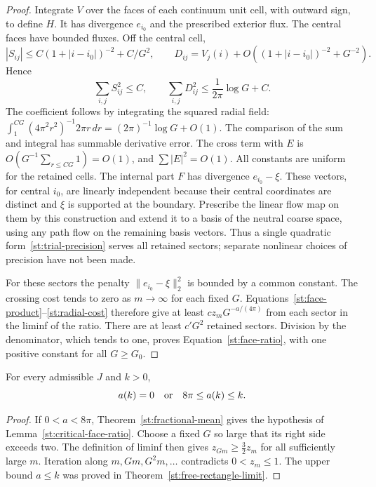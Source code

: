 \begin{proof}
Integrate $V$ over the faces of each continuum unit cell, with outward
sign, to define $H$. It has divergence $e_{i_0}$ and the prescribed exterior
flux. The central faces have bounded fluxes. Off the central cell,
\[
 |S_{ij}|\le C(1+|i-i_0|)^{-2}+C/G^2,
 \qquad D_{ij}=V_j(i)+O((1+|i-i_0|)^{-2}+G^{-2}).
\]
Hence
\begin{equation}\label{st:radial-cost}
 \sum_{i,j}S_{ij}^2\le C,\qquad
 \sum_{i,j}D_{ij}^2\le\frac1{2\pi}\log G+C.
\end{equation}
The coefficient follows by integrating the squared radial field:
$\int_1^{CG}(4\pi^2r^2)^{-1}2\pi r\,dr=(2\pi)^{-1}\log G+O(1)$.
The comparison of the sum and integral has summable derivative error.
The cross term with $E$ is $O(G^{-1}\sum_{r\le CG}1)=O(1)$, and
$\sum|E|^2=O(1)$. All constants are uniform for the retained cells.
The internal part $F$ has divergence $e_{i_0}-\xi$. These vectors, for
central $i_0$, are linearly independent because their central coordinates
are distinct and $\xi$ is supported at the boundary. Prescribe the linear
flow map on them by this construction and extend it to a basis of the
neutral coarse space, using any path flow on the remaining basis vectors.
Thus a single quadratic form~\eqref{st:trial-precision} serves all retained
sectors; separate nonlinear choices of precision have not been made.

For these sectors the penalty $\|e_{i_0}-\xi\|_2^2$ is bounded by a common
constant. The crossing cost tends to zero as $m\to\infty$ for each fixed
$G$. Equations~\eqref{st:face-product}--\eqref{st:radial-cost} therefore give
at least $c z_mG^{-a/(4\pi)}$ from each sector in the liminf of the ratio.
There are at least $c'G^2$ retained sectors. Division by the denominator,
which tends to one, proves Equation~\eqref{st:face-ratio}, with one positive
constant for all $G\ge G_0$.
\end{proof}

\begin{corollary}\label{st:charge-gap}
For every admissible $J$ and $k>0$,
\begin{equation}\label{st:gap}
 a(k)=0\quad\hbox{or}\quad 8\pi\le a(k)\le k.
\end{equation}
\end{corollary}

\begin{proof}
If $0<a<8\pi$, Theorem~\ref{st:fractional-mean} gives the hypothesis of
Lemma~\ref{st:critical-face-ratio}. Choose a fixed $G$ so large that its
right side exceeds two. The definition of liminf then gives
$z_{Gm}\ge\frac32z_m$ for all sufficiently large $m$. Iteration along
$m,Gm,G^2m,\ldots$ contradicts $0<z_m\le1$. The upper bound $a\le k$ was
proved in Theorem~\ref{st:free-rectangle-limit}.
\end{proof}

